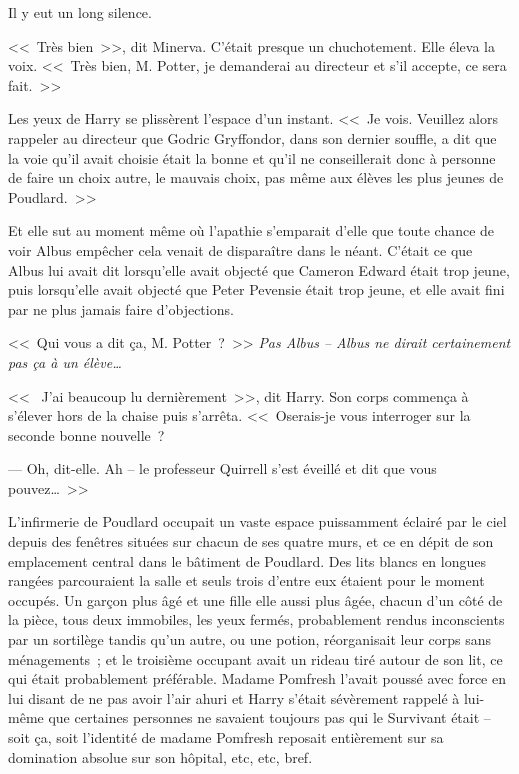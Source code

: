 Il y eut un long silence.

<<~Très bien~>>, dit Minerva. C'était presque un chuchotement. Elle éleva la voix. <<~Très bien, M. Potter, je demanderai au directeur et s'il accepte, ce sera fait.~>>

Les yeux de Harry se plissèrent l'espace d'un instant. <<~Je vois. Veuillez alors rappeler au directeur que Godric Gryffondor, dans son dernier souffle, a dit que la voie qu'il avait choisie était la bonne et qu'il ne conseillerait donc à personne de faire un choix autre, le mauvais choix, pas même aux élèves les plus jeunes de Poudlard.~>>

Et elle sut au moment même où l'apathie s'emparait d'elle que toute chance de voir Albus empêcher cela venait de disparaître dans le néant. C'était ce que Albus lui avait dit lorsqu'elle avait objecté que Cameron Edward était trop jeune, puis lorsqu'elle avait objecté que Peter Pevensie était trop jeune, et elle avait fini par ne plus jamais faire d'objections.

<<~Qui vous a dit ça, M. Potter~?~>> \emph{Pas Albus -- Albus ne dirait certainement pas ça à un élève…}

<<~ J'ai beaucoup lu dernièrement~>>, dit Harry. Son corps commença à s'élever hors de la chaise puis s'arrêta. <<~Oserais-je vous interroger sur la seconde bonne nouvelle~?

--- Oh, dit-elle. Ah -- le professeur Quirrell s'est éveillé et dit que vous pouvez…~>>

\later

L'infirmerie de Poudlard occupait un vaste espace puissamment éclairé par le ciel depuis des fenêtres situées sur chacun de ses quatre murs, et ce en dépit de son emplacement central dans le bâtiment de Poudlard. Des lits blancs en longues rangées parcouraient la salle et seuls trois d'entre eux étaient pour le moment occupés. Un garçon plus âgé et une fille elle aussi plus âgée, chacun d'un côté de la pièce, tous deux immobiles, les yeux fermés, probablement rendus inconscients par un sortilège tandis qu'un autre, ou une potion, réorganisait leur corps sans ménagements~; et le troisième occupant avait un rideau tiré autour de son lit, ce qui était probablement préférable. Madame Pomfresh l'avait poussé avec force en lui disant de ne pas avoir l'air ahuri et Harry s'était sévèrement rappelé à lui-même que certaines personnes ne savaient toujours pas qui le Survivant était -- soit ça, soit l'identité de madame Pomfresh reposait entièrement sur sa domination absolue sur son hôpital, etc, etc, bref.

